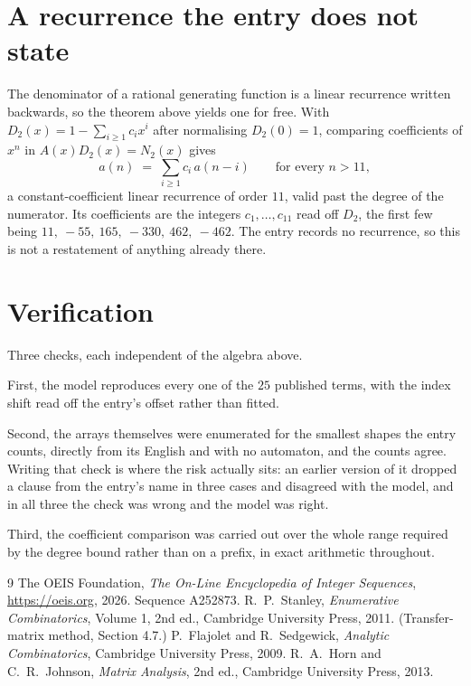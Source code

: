 \documentclass[11pt,a4paper]{article}
\theoremstyle{plain}
\theoremstyle{definition}
\begin{document}
\section{A recurrence the entry does not state}

The denominator of a rational generating function is a linear recurrence written backwards, so
the theorem above yields one for free. With $D_2(x)=1-\sum_{i\ge1}c_ix^i$ after normalising
$D_2(0)=1$, comparing coefficients of $x^n$ in $A(x)D_2(x)=N_2(x)$ gives
\[
a(n)\;=\;\sum_{i\ge1}c_i\,a(n-i)\qquad\text{for every }n>11,
\]
a constant-coefficient linear recurrence of order $11$, valid past the degree of the
numerator. Its coefficients are the integers $c_1,\dots,c_{11}$ read off $D_2$, the first few being $11,\ -55,\ 165,\ -330,\ 462,\ -462$. The entry records no recurrence, so this is not a restatement of anything
already there.

\section{Verification}

Three checks, each independent of the algebra above.

First, the model reproduces every one of the $25$ published terms, with the index shift
read off the entry's offset rather than fitted.

Second, the arrays themselves were enumerated for the smallest shapes the entry counts,
directly from its English and with no automaton, and the counts agree. Writing that check is
where the risk actually sits: an earlier version of it dropped a clause from the entry's name
in three cases and disagreed with the model, and in all three the check was wrong and the model
was right.

Third, the coefficient comparison was carried out over the whole range required by the degree
bound rather than on a prefix, in exact arithmetic throughout.

\begin{thebibliography}{9}
 The OEIS Foundation, \emph{The On-Line Encyclopedia of Integer
Sequences}, \url{https://oeis.org}, 2026. Sequence A252873.
 R.~P.~Stanley, \emph{Enumerative Combinatorics}, Volume 1, 2nd ed.,
Cambridge University Press, 2011. (Transfer-matrix method, Section 4.7.)
 P.~Flajolet and R.~Sedgewick, \emph{Analytic Combinatorics}, Cambridge
University Press, 2009.
 R.~A.~Horn and C.~R.~Johnson, \emph{Matrix Analysis}, 2nd ed., Cambridge
University Press, 2013.
\end{thebibliography}
\end{document}
